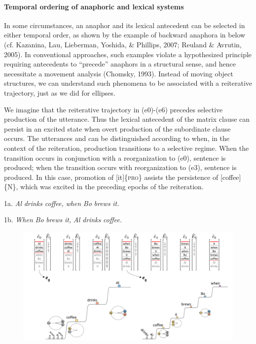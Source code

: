\paragraph{Temporal ordering of anaphoric and lexical systems}

In some circumstances, an anaphor and its lexical antecedent can be selected in either temporal order, as shown by the example of backward anaphora in  below (cf. Kazanina, Lau, Lieberman, Yoshida, \& Phillips, 2007; Reuland \& Avrutin, 2005). In conventional approaches, such examples violate a hypothesized principle requiring antecedents to “precede” anaphors in a structural sense, and hence necessitate a movement analysis (Chomsky, 1993). Instead of moving object structures, we can understand such phenomena to be associated with a reiterative trajectory, just as we did for ellipses.

  We imagine that the reiterative trajectory in (e0)-(e6) precedes selective production of the utterance. Thus the lexical antecedent of the matrix clause can persist in an excited state when overt production of the subordinate clause occurs. The utterances  and  can be distinguished according to when, in the context of the reiteration, production transitions to a selective regime. When the transition occurs in conjunction with a reorganization to (e0), sentence  is produced; when the transition occurs with reorganization to (e3), sentence  is produced. In this case, promotion of [it]\{\textsc{pro}\} assists the persistence of [coffee]\{N\}, which was excited in the preceding epochs of the reiteration.

1a. \textit{Al} \textit{drinks} \textit{coffee,} \textit{when} \textit{Bo} \textit{brews} \textit{it.}

1b. \textit{When} \textit{Bo} \textit{brews} \textit{it,} \textit{Al} \textit{drinks} \textit{coffee.}    

  
\begin{figure}
\includegraphics[width=\textwidth]{figures/Tilsen-img154.png}
\caption{\missingcaption}
\label{fig:}
\end{figure}
 

